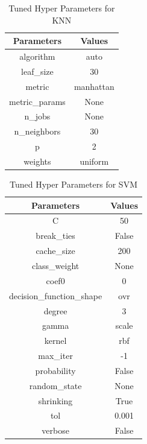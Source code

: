 \documentclass[conference]{IEEEtran}
\begin{document}
\begin{table}[!ht]
    \caption{Tuned Hyper Parameters for KNN}
    \centering
    \begin{tabular}{c c}
        \hline 
        \bfseries Parameters & \bfseries Values\\
        \hline  \hline
        algorithm & auto\\
        leaf\_size & 30\\
        metric & manhattan\\
        metric\_params & None\\
        n\_jobs & None\\
        n\_neighbors & 30\\
        p & 2\\
        weights & uniform \\
        \hline
    \end{tabular}
\end{table}

\begin{table}[!ht]
    \caption{Tuned Hyper Parameters for SVM}
    \centering
    \begin{tabular}{c c}
        \hline 
        \bfseries Parameters & \bfseries Values\\
        \hline  \hline
        C & 50\\
        break\_ties & False\\
        cache\_size & 200\\
        class\_weight & None\\
        coef0 & 0\\
        decision\_function\_shape & ovr\\
        degree & 3\\
        gamma & scale\\
        kernel & rbf \\
        max\_iter & -1\\
        probability & False\\
        random\_state & None\\
        shrinking & True\\
        tol & 0.001\\
        verbose & False\\
        \hline
    \end{tabular}
\end{table}
\end{document}
